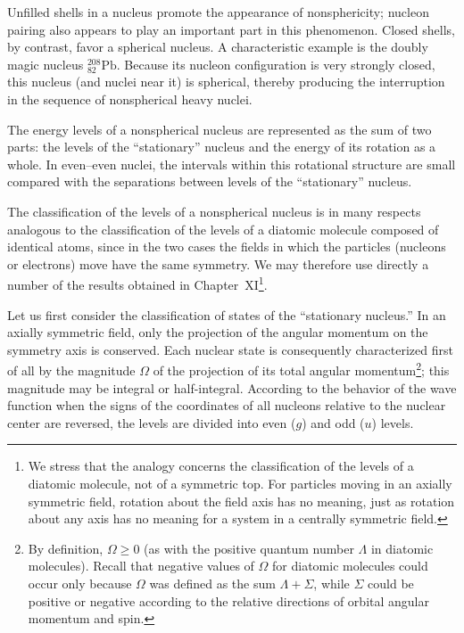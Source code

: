 Unfilled shells in a nucleus promote the appearance of nonsphericity; nucleon
pairing also appears to play an important part in this phenomenon. Closed
shells, by contrast, favor a spherical nucleus. A characteristic example is
the doubly magic nucleus ${}^{208}_{82}\mathrm{Pb}$. Because its nucleon
configuration is very strongly closed, this nucleus (and nuclei near it) is
spherical, thereby producing the interruption in the sequence of nonspherical
heavy nuclei.

The energy levels of a nonspherical nucleus are represented as the sum of two
parts: the levels of the ``stationary'' nucleus and the energy of its rotation
as a whole. In even--even nuclei, the intervals within this rotational
structure are small compared with the separations between levels of the
``stationary'' nucleus.

The classification of the levels of a nonspherical nucleus is in many respects
analogous to the classification of the levels of a diatomic molecule composed
of identical atoms, since in the two cases the fields in which the particles
(nucleons or electrons) move have the same symmetry. We may therefore use
directly a number of the results obtained in Chapter~XI\footnote{We stress that
the analogy concerns the classification of the levels of a diatomic molecule,
not of a symmetric top. For particles moving in an axially symmetric field,
rotation about the field axis has no meaning, just as rotation about any axis
has no meaning for a system in a centrally symmetric field.}.

Let us first consider the classification of states of the ``stationary
nucleus.'' In an axially symmetric field, only the projection of the angular
momentum on the symmetry axis is conserved. Each nuclear state is consequently
characterized first of all by the magnitude $\Omega$ of the projection of its
total angular momentum\footnote{By definition, $\Omega\geqslant0$ (as with
the positive quantum number $\Lambda$ in diatomic molecules). Recall that
negative values of $\Omega$ for diatomic molecules could occur only because
$\Omega$ was defined as the sum $\Lambda+\Sigma$, while $\Sigma$ could be
positive or negative according to the relative directions of orbital angular
momentum and spin.}; this magnitude may be integral or half-integral. According
to the behavior of the wave function when the signs of the coordinates of all
nucleons relative to the nuclear center are reversed, the levels are divided
into even ($g$) and odd ($u$) levels.

